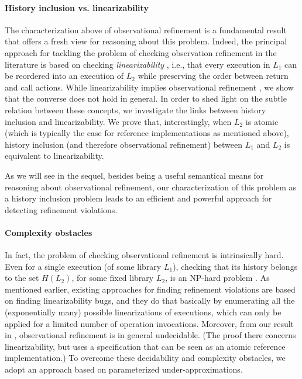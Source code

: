 \paragraph{History inclusion vs. linearizability} The characterization above of observational refinement is a fundamental result that offers a fresh view for reasoning about this problem. Indeed, the principal approach for tackling the problem of checking observation refinement in the literature is based on checking {\em linearizability} \cite{}, i.e., that every execution in $L_1$ can be reordered into an execution of $L_2$ while preserving the order between return and call actions. While linearizability implies observational refinement \cite{}, we show that the converse does not hold in general. 
In order to shed light on the subtle relation between these concepts, we investigate the links between history inclusion and linearizability. We prove that, interestingly, when $L_2$ is atomic (which is typically the case for reference implementations as mentioned above), history inclusion  (and therefore observational refinement) between $L_1$ and $L_2$ is equivalent to linearizability. 

As we will see in the sequel, besides being a useful semantical means for reasoning about observational refinement, our characterization of this problem as a history inclusion problem leads to an efficient and powerful approach for detecting refinement violations. 

\paragraph{Complexity obstacles} In fact, the problem of checking observational refinement is intrinsically hard. Even for a single execution (of some library $L_1$), checking that its history belongs to the set  $H(L_2)$, for some fixed library $L_2$, is an NP-hard problem \cite{}. As mentioned earlier, existing approaches for finding refinement violations are based on finding linearizability bugs, and they do that basically by enumerating all the (exponentially many) possible linearizations of executions, which can only be applied for a limited number of operation invocations. Moreover, from our result in \cite{}, observational refinement is in general undecidable. (The proof there concerns linearizability, but uses a specification that can be seen as an atomic reference implementation.) To overcome these decidability and complexity obstacles, we adopt an approach based on parameterized under-approximations.

